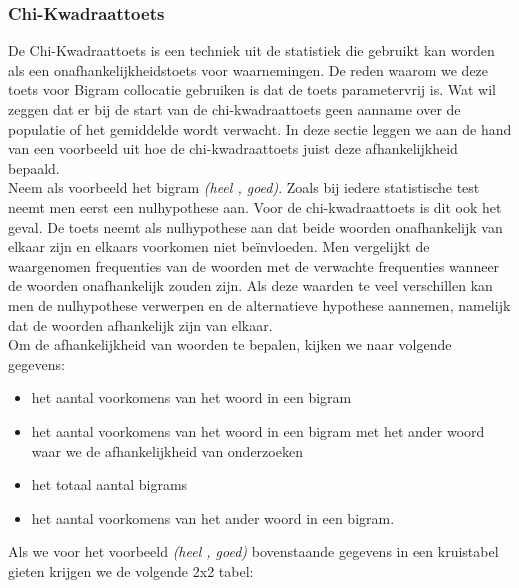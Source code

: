 \subsubsection{Chi-Kwadraattoets}\label{Chi-Kwadraattoest}

De Chi-Kwadraattoets is een techniek uit de statistiek die gebruikt  kan worden als een onafhankelijkheidstoets voor waarnemingen. De reden waarom we deze toets voor Bigram collocatie gebruiken is dat de toets parametervrij is. Wat wil zeggen dat er bij de start van de chi-kwadraattoets geen aanname over de populatie of het gemiddelde wordt verwacht. In deze sectie leggen we aan de hand van een voorbeeld uit hoe de chi-kwadraattoets juist deze afhankelijkheid bepaald.\\
%
Neem als voorbeeld het bigram \textit{(heel , goed)}. Zoals bij iedere statistische test neemt men eerst een nulhypothese aan. Voor de chi-kwadraattoets is dit ook het geval. De toets neemt als nulhypothese aan dat beide woorden onafhankelijk van elkaar zijn en elkaars voorkomen niet be\"invloeden. Men vergelijkt de waargenomen frequenties van de woorden met de verwachte frequenties wanneer de woorden onafhankelijk zouden zijn. Als deze waarden te veel verschillen kan men de nulhypothese verwerpen en de alternatieve hypothese aannemen, namelijk dat de woorden afhankelijk zijn van elkaar. \\
\newline
%
Om de afhankelijkheid van woorden te bepalen, kijken we naar volgende gegevens:
\begin{itemize}
  \item het aantal voorkomens van het woord in een bigram
  \item het aantal voorkomens van het woord in een bigram met het ander woord waar we de afhankelijkheid van onderzoeken
  \item het totaal aantal bigrams
  \item het aantal voorkomens van het ander woord in een bigram. 
\end{itemize}
%
%
Als we voor het voorbeeld \textit{(heel , goed)} bovenstaande gegevens in een kruistabel gieten krijgen we de volgende 2x2 tabel:
